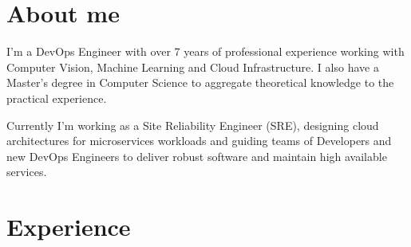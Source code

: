 \documentclass[a4paper]{cv-friggeri-x}
\begin{document}

\section{About me}
I'm a DevOps Engineer with over 7 years of professional experience working with Computer Vision, Machine Learning and Cloud Infrastructure. I also have a Master's degree in Computer Science to aggregate theoretical knowledge to the practical experience.

Currently I'm working as a Site Reliability Engineer (SRE), designing cloud architectures for microservices workloads and guiding teams of Developers and new DevOps Engineers to deliver robust software and maintain high available services.



\section{Experience}

\end{document}
